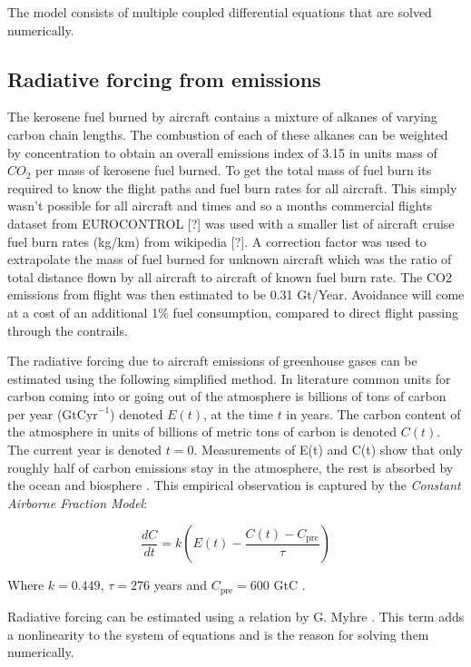 \documentclass{article}
\begin{document}
The model consists of multiple coupled differential equations that are solved numerically.

\subsection{Radiative forcing from emissions}

The kerosene fuel burned by aircraft contains a mixture of alkanes of varying carbon chain lengths.
The combustion of each of these alkanes can be weighted by concentration to obtain an overall
emissions index of 3.15 in units mass of $CO_2$ per mass of kerosene fuel burned.
To get the total mass of fuel burn its required to know the flight paths and fuel burn rates for all aircraft.
This simply wasn't possible for all aircraft and times and so a months commercial flights dataset from EUROCONTROL [?] was used with a smaller list of aircraft cruise fuel burn rates (kg/km) from wikipedia [?].
A correction factor was used to extrapolate the mass of fuel burned for unknown aircraft which was the ratio of total distance flown by all aircraft to aircraft of known fuel burn rate.
The CO2 emissions from flight was then estimated to be 0.31 Gt/Year.
Avoidance will come at a cost of an additional 1\% fuel consumption, compared to direct flight passing through the contrails.

The radiative forcing due to aircraft emissions of greenhouse gases can be estimated using the following simplified method.
In literature common units for carbon coming into or going out of the atmosphere is billions of tons of carbon per year ($\text{GtCyr}^{-1}$)
denoted $E(t)$, at the time $t$ in years. The carbon content of the atmosphere in units of billions of metric tons of carbon is denoted $C(t)$.
The current year is denoted $t=0$.
Measurements of E(t) and C(t) show that only roughly half of carbon emissions stay in the atmosphere, the rest is absorbed by the ocean and biosphere \cite{co2_modelling}.
This empirical observation is captured by the \emph{Constant Airborne Fraction Model}:

\begin{equation}
    \frac{dC}{dt} = k \left( E(t) - \frac{C(t)-C_\text{pre}}{\tau}\right)
\end{equation}

Where $k = 0.449$, $\tau = 276 $ years and $C_\text{pre} = 600$ GtC \cite{co2_modelling}.

Radiative forcing can be estimated using a relation by G. Myhre \cite{rf_greenhouse}.
This term adds a nonlinearity to the system of equations and is the reason for solving them numerically.
\end{document}
